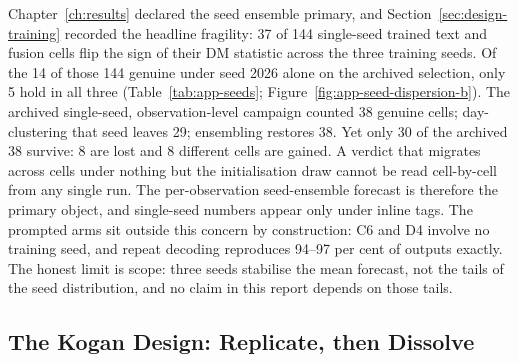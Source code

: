 Chapter~\ref{ch:results} declared the seed ensemble primary, and Section~\ref{sec:design-training} recorded the headline fragility: 37 of 144 single-seed trained text and fusion cells flip the sign of their DM statistic across the three training seeds. Of the 14 of those 144 genuine under seed 2026 alone on the archived selection, only 5 hold in all three (Table~\ref{tab:app-seeds}; Figure~\ref{fig:app-seed-dispersion-b}). %
The archived single-seed, observation-level campaign counted 38 genuine cells; day-clustering that seed leaves 29; ensembling restores 38. Yet only 30 of the archived 38 survive: 8 are lost and 8 different cells are gained. %
A verdict that migrates across cells under nothing but the initialisation draw cannot be read cell-by-cell from any single run. The per-observation seed-ensemble forecast is therefore the primary object, and single-seed numbers appear only under inline tags. The prompted arms sit outside this concern by construction: C6 and D4 involve no training seed, and repeat decoding reproduces 94--97 per cent of outputs exactly. %
The honest limit is scope: three seeds stabilise the mean forecast, not the tails of the seed distribution, and no claim in this report depends on those tails.

\subsection{The Kogan Design: Replicate, then Dissolve}
\label{sec:val-kogan}

